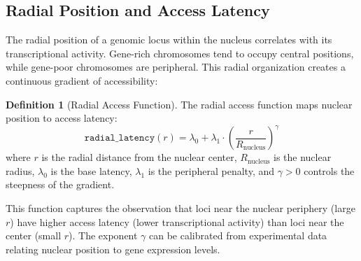 \documentclass[12pt,a4paper]{article}
\theoremstyle{plain}
\theoremstyle{definition}
\newtheorem{definition}[theorem]{Definition}
\begin{document}
\begin{center}
\end{center}

\subsection{Radial Position and Access Latency}

The radial position of a genomic locus within the nucleus correlates with its transcriptional activity. Gene-rich chromosomes tend to occupy central positions, while gene-poor chromosomes are peripheral. This radial organization creates a continuous gradient of accessibility:

\begin{definition}[Radial Access Function]\label{def:radial-access}
The radial access function maps nuclear position to access latency:
\[
  \texttt{radial\_latency}(r) = \lambda_0 + \lambda_1 \cdot \left(\frac{r}{R_{\text{nucleus}}}\right)^\gamma
\]
where $r$ is the radial distance from the nuclear center, $R_{\text{nucleus}}$ is the nuclear radius, $\lambda_0$ is the base latency, $\lambda_1$ is the peripheral penalty, and $\gamma > 0$ controls the steepness of the gradient.
\end{definition}

This function captures the observation that loci near the nuclear periphery (large $r$) have higher access latency (lower transcriptional activity) than loci near the center (small $r$). The exponent $\gamma$ can be calibrated from experimental data relating nuclear position to gene expression levels.


\end{document}
